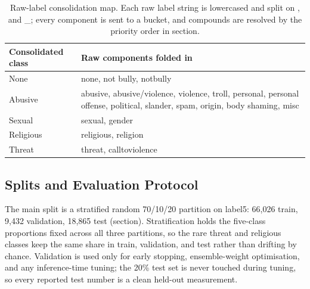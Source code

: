 \documentclass[11pt,a4paper]{article}
\def\cref#1{section}%
\def\texttt#1{#1}%
\def\emph#1{#1}%
\begin{document}
\begin{table}[!htbp]
\centering
\caption{Raw-label consolidation map. Each raw label string is lowercased and split on \texttt{,} and \texttt{\_}; every component is sent to a bucket, and compounds are resolved by the priority order in \cref{eq:priority}.}
\label{tab:consolidation}
\small
\begin{tabularx}{\textwidth}{@{}lX@{}}
\toprule
\textbf{Consolidated class} & \textbf{Raw components folded in} \\
\midrule
None & \texttt{none}, \texttt{not bully}, \texttt{notbully} \\
Abusive & \texttt{abusive}, \texttt{abusive/violence}, \texttt{violence}, \texttt{troll}, \texttt{personal}, \texttt{personal offense}, \texttt{political}, \texttt{slander}, \texttt{spam}, \texttt{origin}, \texttt{body shaming}, \texttt{misc} \\
Sexual & \texttt{sexual}, \texttt{gender} \\
Religious & \texttt{religious}, \texttt{religion} \\
Threat & \texttt{threat}, \texttt{calltoviolence} \\
\bottomrule
\end{tabularx}
\end{table}

\subsection{Splits and Evaluation Protocol}
\label{sec:splits}

The main split is a stratified random 70/10/20 partition on \texttt{label5}: 66{,}026 train, 9{,}432 validation, 18{,}865 test (\cref{tab:split}). Stratification holds the five-class proportions fixed across all three partitions, so the rare \emph{threat} and \emph{religious} classes keep the same share in train, validation, and test rather than drifting by chance. Validation is used only for early stopping, ensemble-weight optimisation, and any inference-time tuning; the 20\% test set is never touched during tuning, so every reported test number is a clean held-out measurement.
\end{document}
